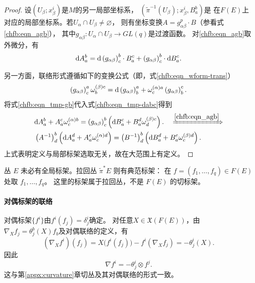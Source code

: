 \begin{proof}
设$\left(U_{\beta} ; x_{\beta}^{i}\right)$是$M$的另一局部坐标系，
$\left(\tilde{\pi}^{-1}\left(U_{\beta}\right) ; x_{\beta}^{i}, B_{a}^{b}\right)$是
在$F(E)$上对应的局部坐标系。若$U_{\alpha} \cap U_{\beta} \neq \varnothing$，
则有坐标变换$A=g_{\alpha \beta}^p \cdot B$（参看式\eqref{chfb:eqn_agb}），
其中$g_{\alpha \beta}: U_{\alpha} \cap U_{\beta} \rightarrow GL(q)$是过渡函数。
对\eqref{chfb:eqn_agb}取外微分，有
\begin{equation}\label{chfb:eqn_tmp-dabc}
    \dd A_{a}^{b}=\dd \left(g_{\alpha \beta}\right)_{c}^{b} \cdot
    B_{a}^{c}+\left(g_{\alpha \beta}\right)_{c}^{b} \cdot \dd B_{a}^{c}.
\end{equation}

另一方面，联络形式遵循如下的变换公式（即，式\eqref{chfb:eqn_wform-trans}）
\begin{equation}\label{chfb:eqn_tmp-gb}
    \left(g_{\alpha \beta}\right)_{c}^{a} \omega_{b}^{(\beta) c}=\dd
    \left(g_{\alpha\beta}\right)_{b}^{a}+
    \omega_{c}^{(\alpha) a} \left(g_{\alpha \beta}\right)_{b}^{c}.
\end{equation}
将式\eqref{chfb:eqn_tmp-gb}代入式\eqref{chfb:eqn_tmp-dabc}得到
\begin{align*}
    &\dd A_{a}^{b}+A_{a}^{c}  \omega_{c}^{(\alpha) b}
    =\left(g_{\alpha \beta}\right)_{c}^{b}\left(\dd B_{a}^{c}
    +B_{a}^{d}  \omega_{d}^{(\beta) c}\right).
\quad \xRightarrow{\ref{chfb:eqn_agb}} \\
&\left(A^{-1}\right)_{d}^{b} \left(\dd A_{a}^{d}
+A_{a}^{c}  \omega_{c}^{(\alpha) d}\right)
=\left(B^{-1}\right)_{d}^{b}\left(\dd B_{a}^{d}
+B_{a}^{c}  \omega_{c}^{(\beta) d}\right) .
\end{align*}
上式表明定义与局部标架选取无关，故在大范围上有定义。
\end{proof}

丛 $E$ 未必有全局标架。拉回丛 $\tilde\pi^*E$ 则有典范标架：
在 $f=(f_1,\ldots,f_q)\in F(E)$ 处取 $f_1,\ldots,f_q$。
这里的标架属于拉回丛，不是 $F(E)$ 的切标架。

\paragraph{对偶标架的联络}
对偶标架$\{f^{i}\}$由$f^{i}(f_j)=\delta^i_j$确定。
对任意$X\in\mathfrak{X}(F(E))$，由$\nabla_X f_j=\theta^b_j(X)f_b$及对偶联络的定义，有
\[
    (\nabla_X f^{i})(f_j)
    =X\bigl(f^{i}(f_j)\bigr)-f^{i}(\nabla_X f_j)
    =-\theta^i_j(X).
\]
因此
\begin{equation}
    \nabla f^{i}=-\theta^i_j\otimes f^{j}.
\end{equation}
这与第\ref{appx:curvature}章切丛及其对偶联络的形式一致。

